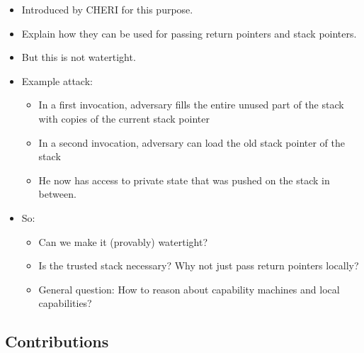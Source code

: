 \documentclass[compsoc,conference,letterpaper,fleqn]{IEEEtran}
\begin{document}
\begin{itemize}
\item Introduced by CHERI for this purpose.
\item Explain how they can be used for passing return pointers and stack pointers.
\item But this is not watertight.
\item Example attack:
\begin{itemize}
\item In a first invocation, adversary fills the entire unused part of the stack with copies of the current stack pointer
\item In a second invocation, adversary can load the old stack pointer of the stack
\item He now has access to private state that was pushed on the stack in between.
\end{itemize}
\item So:
\begin{itemize}
\item Can we make it (provably) watertight?
\item Is the trusted stack necessary? Why not just pass return pointers locally?
\item General question: How to reason about capability machines and
local capabilities?
\end{itemize}
\end{itemize}

\subsection{Contributions}
\end{document}

